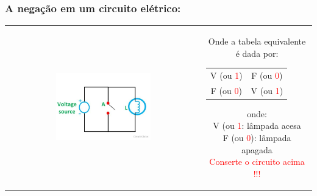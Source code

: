 \documentclass{beamer}
\begin{document}
\begin{frame}
\frametitle{A \textbf{negação} em um circuito elétrico:}

\begin{tabular}{c||c}  
 
 \includegraphics[height=0.5\textheight,width=0.5\textwidth]{figuras/circuito_NOT.jpg} 
 
  &
  \parbox{0.4\linewidth}{\vspace{-4cm} Onde a tabela equivalente é dada por:
  \begin{tabular}{|c|c|}
	\hline
	$\mathbf{A}$ & $\mathbf{\sim A}$ \\
	\hline
	V (ou  \textcolor{red}{1}) & F (ou \textcolor{red}{0}) \\
	\hline
	F (ou \textcolor{red}{0}) & V (ou \textcolor{red}{1})  \\
	\hline
	\end{tabular}
	onde:\\
	V (ou  \textcolor{red}{1}: lâmpada acesa\\
	F (ou \textcolor{red}{0}): lâmpada apagada\\
	\textcolor{red}{Conserte o circuito acima !!!}
  } %

\end{tabular} 	

\end{frame}
\end{document}

